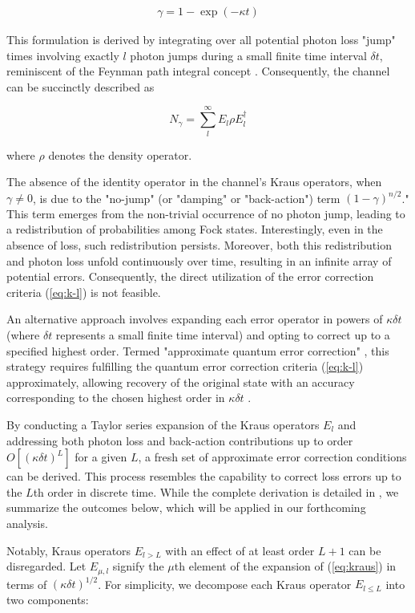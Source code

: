 \documentclass[11pt]{article}
\newcommand\0{\mathbf{0}}
\newcommand\<{\langle}
\renewcommand\>{\rangle}
\begin{document}
\begin{align}
\label{eq:gamma}
	\gamma = 1 - \exp(- \kappa t)
\end{align}

This formulation is derived by integrating over all potential photon loss "jump" times involving exactly $l$ photon jumps during a small finite time interval $\delta t$, reminiscent of the Feynman path integral concept \cite{chuang1997bosonic}. Consequently, the channel can be succinctly described as

$$
N_\gamma = \sum_l^\infty E_l \rho E_l^\dag
$$

where $\rho$ denotes the density operator.


The absence of the identity operator in the channel's Kraus operators, when $\gamma \neq 0$, is due to the "no-jump" (or "damping" or "back-action") term $(1-\gamma)^{n / 2}$." This term emerges from the non-trivial occurrence of no photon jump, leading to a redistribution of probabilities among Fock states. Interestingly, even in the absence of loss, such redistribution persists. Moreover, both this redistribution and photon loss unfold continuously over time, resulting in an infinite array of potential errors. Consequently, the direct utilization of the error correction criteria (\ref{eq:k-l}) is not feasible.

An alternative approach involves expanding each error operator in powers of $\kappa \delta t$ (where $\delta t$ represents a small finite time interval) and opting to correct up to a specified highest order. Termed "approximate quantum error correction" \cite{mandayam2012towards}, this strategy requires fulfilling the quantum error correction criteria (\ref{eq:k-l}) approximately, allowing recovery of the original state with an accuracy corresponding to the chosen highest order in $\kappa \delta t$ \cite{michael2016new}.

By conducting a Taylor series expansion of the Kraus operators $E_l$ and addressing both photon loss and back-action contributions up to order $O[(\kappa \delta t)^L]$ for a given $L$, a fresh set of approximate error correction conditions can be derived. This process resembles the capability to correct loss errors up to the $L$th order in discrete time. While the complete derivation is detailed in \cite{michael2016new}, we summarize the outcomes below, which will be applied in our forthcoming analysis.

Notably, Kraus operators $E_{l>L}$ with an effect of at least order $L+1$ can be disregarded. Let $E_{\mu, l}$ signify the $\mu$th element of the expansion of (\ref{eq:kraus}) in terms of $(\kappa\delta t)^{1/2}$. For simplicity, we decompose each Kraus operator $E_{l \leq L}$ into two components:
\end{document}
